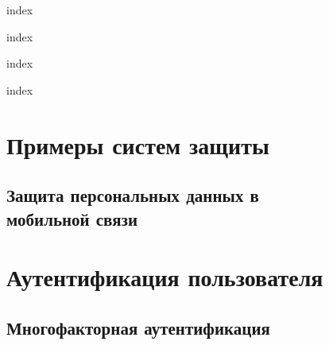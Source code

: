 





{index}





{index}



{index}

{index}

\chapter{Примеры систем защиты}









\section[Защита персональных данных в мобильной связи]{Защита персональных данных в \protect\\ мобильной связи}






\chapter{Аутентификация пользователя}


\section{Многофакторная аутентификация}

